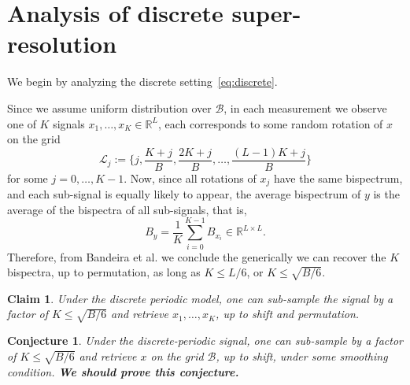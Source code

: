 \documentclass[english,12pt]{article}
\newtheorem{claim}{Claim}
\newtheorem{conj}{Conjecture}
\newcommand{\R}{\mathbb{R}}
\numberwithin{equation}{section}
\begin{document}
\section{Analysis of discrete super-resolution}

We begin by analyzing the discrete setting~\eqref{eq:discrete}. 

Since we assume uniform distribution over $\mathcal{B}$, in each measurement we observe one of $K$ signals $x_1,\ldots,x_K\in\R^L$, each corresponds to some random rotation of $x$ on the grid  $$\mathcal{L}_j:=\{j,\frac{K+j}{B},\frac{2K+j}{B},\ldots,\frac{(L-1)K+j}{B}\}$$ for some $j=0,\ldots,K-1$.
Now, since all rotations of $x_j$ have the same bispectrum, and each sub-signal is equally likely to appear, the  
average bispectrum of $y$ is the average of the bispectra of all sub-signals, that is,$$B_y = \frac{1}{K}\sum_{i=0}^{K-1}B_{x_i}\in\R^{L\times L}.$$ 
 Therefore, from Bandeira et al. we conclude the generically we can recover the $K$ bispectra, up to permutation, as long as $K\leq L/6$, or $K\leq \sqrt{B/6}$.

\begin{claim} \label{claim1}
Under the discrete periodic model, one can sub-sample the signal by a factor of  	$K\leq \sqrt{B/6}$ and retrieve $x_1,\ldots,x_K$, up to shift and permutation. 
\end{claim}	

\begin{conj} \label{conj1}
	Under the discrete-periodic signal, one can sub-sample by a factor of  	$K\leq \sqrt{B/6}$ and retrieve  $x$ on the grid $\mathcal{B}$, up to shift, under some smoothing condition. \textbf{We should prove this conjecture.}
\end{conj}	
\end{document}
